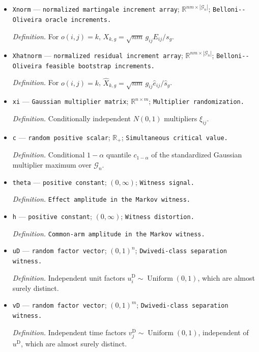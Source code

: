 \documentclass{article}
\begin{document}
\begin{itemize}
  \item \texttt{Xnorm} --- \texttt{normalized martingale increment array}; \(\mathbb R^{nm\times|\mathcal G_n|}\); \texttt{Belloni-\allowbreak{}-\allowbreak{}Oliveira oracle increments.}
  \par\smallskip\noindent\emph{Definition.} For \(o(i,j)=k\), \(X_{k,g}=\sqrt{nm}\,g_{ij}E_{ij}/s_g\).
  \item \texttt{Xhatnorm} --- \texttt{normalized residual increment array}; \(\mathbb R^{nm\times|\mathcal G_n|}\); \texttt{Belloni-\allowbreak{}-\allowbreak{}Oliveira feasible bootstrap increments.}
  \par\smallskip\noindent\emph{Definition.} For \(o(i,j)=k\), \(\widehat X_{k,g}=\sqrt{nm}\,g_{ij}\widehat e_{ij}/\widehat s_g\).
  \item \texttt{xi} --- \texttt{Gaussian multiplier matrix}; \(\mathbb R^{n\times m}\); \texttt{Multiplier randomization.}
  \par\smallskip\noindent\emph{Definition.} Conditionally independent \(N(0,1)\) multipliers \(\xi_{ij}\).
  \item \texttt{c} --- \texttt{random positive scalar}; \(\mathbb R_+\); \texttt{Simultaneous critical value.}
  \par\smallskip\noindent\emph{Definition.} Conditional \(1-\alpha\) quantile \(c_{1-\alpha}\) of the standardized Gaussian multiplier maximum over \(\mathcal G_n\).
  \item \texttt{theta} --- \texttt{positive constant}; \((0,\infty)\); \texttt{Witness signal.}
  \par\smallskip\noindent\emph{Definition.} \texttt{Effect amplitude in the Markov witness.}
  \item \texttt{h} --- \texttt{positive constant}; \((0,\infty)\); \texttt{Witness distortion.}
  \par\smallskip\noindent\emph{Definition.} \texttt{Common-\allowbreak{}arm amplitude in the Markov witness.}
  \item \texttt{uD} --- \texttt{random factor vector}; \((0,1)^n\); \texttt{Dwivedi-\allowbreak{}class separation witness.}
  \par\smallskip\noindent\emph{Definition.} Independent unit factors \(u^{\mathrm D}_i\sim\operatorname{Uniform}(0,1)\), which are almost surely distinct.
  \item \texttt{vD} --- \texttt{random factor vector}; \((0,1)^m\); \texttt{Dwivedi-\allowbreak{}class separation witness.}
  \par\smallskip\noindent\emph{Definition.} Independent time factors \(v^{\mathrm D}_j\sim\operatorname{Uniform}(0,1)\), independent of \(u^{\mathrm D}\), which are almost surely distinct.

\end{itemize}
\end{document}
